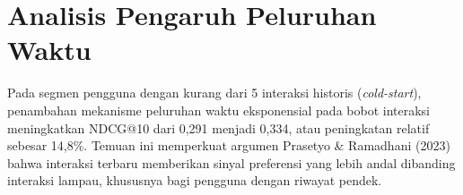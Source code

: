 \section{Analisis Pengaruh Peluruhan Waktu}
Pada segmen pengguna dengan kurang dari 5 interaksi historis
(\emph{cold-start}), penambahan mekanisme peluruhan waktu eksponensial pada
bobot interaksi meningkatkan NDCG@10 dari 0,291 menjadi 0,334, atau
peningkatan relatif sebesar 14,8\%. Temuan ini memperkuat argumen Prasetyo
\& Ramadhani (2023) bahwa interaksi terbaru memberikan sinyal preferensi
yang lebih andal dibanding interaksi lampau, khususnya bagi pengguna dengan
riwayat pendek.

